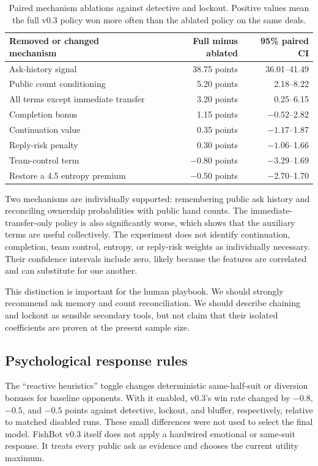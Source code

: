 \documentclass[11pt]{article}
\begin{document}
\begin{table}[ht]
\centering
\caption{Paired mechanism ablations against detective and lockout. Positive values mean the full v0.3 policy won more often than the ablated policy on the same deals.}
\small
\begin{tabular}{lrr}
\toprule
Removed or changed mechanism & Full minus ablated & 95\% paired CI \\
\midrule
Ask-history signal & 38.75 points & 36.01--41.49 \\
Public count conditioning & 5.20 points & 2.18--8.22 \\
All terms except immediate transfer & 3.20 points & 0.25--6.15 \\
Completion bonus & 1.15 points & $-0.52$--2.82 \\
Continuation value & 0.35 points & $-1.17$--1.87 \\
Reply-risk penalty & 0.30 points & $-1.06$--1.66 \\
Team-control term & $-0.80$ points & $-3.29$--1.69 \\
Restore a 4.5 entropy premium & $-0.50$ points & $-2.70$--1.70 \\
\bottomrule
\end{tabular}
\end{table}

Two mechanisms are individually supported: remembering public ask history and reconciling ownership probabilities with public hand counts. The immediate-transfer-only policy is also significantly worse, which shows that the auxiliary terms are useful collectively. The experiment does not identify continuation, completion, team control, entropy, or reply-risk weights as individually necessary. Their confidence intervals include zero, likely because the features are correlated and can substitute for one another.

This distinction is important for the human playbook. We should strongly recommend ask memory and count reconciliation. We should describe chaining and lockout as sensible secondary tools, but not claim that their isolated coefficients are proven at the present sample size.

\subsection{Psychological response rules}

The ``reactive heuristics'' toggle changes deterministic same-half-suit or diversion bonuses for baseline opponents. With it enabled, v0.3's win rate changed by $-0.8$, $-0.5$, and $-0.5$ points against detective, lockout, and bluffer, respectively, relative to matched disabled runs. These small differences were not used to select the final model. FishBot v0.3 itself does not apply a hardwired emotional or same-suit response. It treats every public ask as evidence and chooses the current utility maximum.
\end{document}
